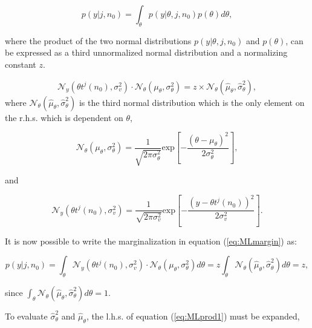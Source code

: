 \begin{equation}\label{eq:MLmargin}
p(y|j,n_0)=\int_\theta p(y|\theta, j, n_0) p(\theta) d\theta,
\end{equation}

where the product of the two normal distributions $p(y|\theta, j, n_0)$ and $p(\theta)$, can be expressed as a third unnormalized normal distribution and a normalizing constant $z$.

\begin{equation}\label{eq:MLprod1}
\mathcal{N}_y(\theta t^j(n_0),\sigma_v^2)\cdot\mathcal{N}_\theta(\mu_\theta,\sigma^2_\theta) = z \times \mathcal{N}_\theta(\hat{\mu}_\theta,\hat{\sigma}^2_\theta),
\end{equation}
where $\mathcal{N}_\theta(\hat{\mu}_\theta,\hat{\sigma}_\theta^2)$ is the third normal distribution which is the only element on the r.h.s. which is dependent on $\theta$,

\begin{equation}\label{eq:MLtheta2}
\mathcal{N}_\theta(\mu_\theta,\sigma^2_\theta) = \frac{1}{\sqrt{2 \pi \sigma_\theta^2}} \textrm{exp}\left[-\frac{\left(\theta - \mu_\theta\right)^2}{2\sigma_\theta^2}\right],
\end{equation}

and

\begin{equation}\label{eq:MLnoise2}
\mathcal{N}_y(\theta t^j(n_0),\sigma_v^2) = \frac{1}{\sqrt{2 \pi \sigma_v^2}} \textrm{exp}\left[-\frac{\left(y - \theta t^j\left(n_0\right)\right)^2}{2\sigma_v^2}\right].
\end{equation}

It is now possible to write the marginalization in equation (\ref{eq:MLmargin}) as:

\begin{equation}\label{eq:MLmargin2}
p(y|j,n_0)=\int_\theta \mathcal{N}_y(\theta t^j(n_0),\sigma_v^2)\cdot\mathcal{N}_\theta(\mu_\theta,\sigma^2_\theta) d\theta = z \int_\theta \mathcal{N}_\theta(\hat{\mu}_\theta,\hat{\sigma}^2_\theta) d\theta = z,
\end{equation}

since $\int_\theta \mathcal{N}_\theta(\hat{\mu}_\theta,\hat{\sigma}^2_\theta) d\theta = 1$.

To evaluate $\hat{\sigma}^2_\theta$ and $\hat{\mu}_\theta$, the l.h.s. of equation (\ref{eq:MLprod1}) must be expanded,

